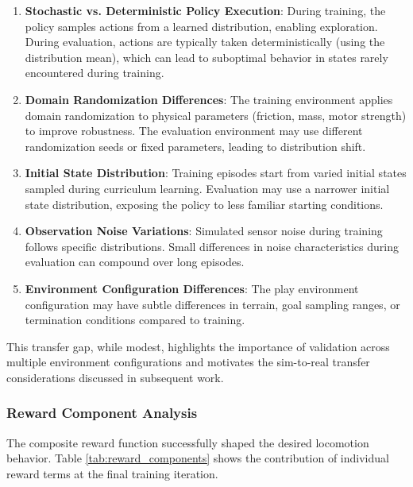 \documentclass[12pt,a4paper]{article}
\begin{document}
\begin{enumerate}
    \item \textbf{Stochastic vs. Deterministic Policy Execution}: During training, the policy samples actions from a learned distribution, enabling exploration. During evaluation, actions are typically taken deterministically (using the distribution mean), which can lead to suboptimal behavior in states rarely encountered during training.

    \item \textbf{Domain Randomization Differences}: The training environment applies domain randomization to physical parameters (friction, mass, motor strength) to improve robustness. The evaluation environment may use different randomization seeds or fixed parameters, leading to distribution shift.

    \item \textbf{Initial State Distribution}: Training episodes start from varied initial states sampled during curriculum learning. Evaluation may use a narrower initial state distribution, exposing the policy to less familiar starting conditions.

    \item \textbf{Observation Noise Variations}: Simulated sensor noise during training follows specific distributions. Small differences in noise characteristics during evaluation can compound over long episodes.

    \item \textbf{Environment Configuration Differences}: The play environment configuration may have subtle differences in terrain, goal sampling ranges, or termination conditions compared to training.
\end{enumerate}

This transfer gap, while modest, highlights the importance of validation across multiple environment configurations and motivates the sim-to-real transfer considerations discussed in subsequent work.

\subsubsection{Reward Component Analysis}

The composite reward function successfully shaped the desired locomotion behavior. Table \ref{tab:reward_components} shows the contribution of individual reward terms at the final training iteration.
\end{document}
